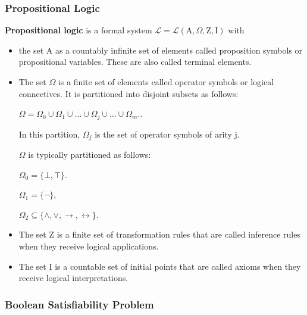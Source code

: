 \documentclass[a4paper, 12pt, bibliography=totoc]{scrartcl}
\begin{document}
\subsubsection{Propositional Logic}
\textbf{Propositional logic} is a formal system $\mathcal{L} = \mathcal{L}(\mathrm {A},\Omega, \mathrm{Z}, \mathrm{I})$ with
\begin{itemize}
	\item the set $\mathrm {A}$ as a countably infinite set of elements called proposition symbols or propositional variables. These are also called terminal elements.
	\item The set $\Omega$ is a finite set of elements called operator symbols or logical connectives. It is partitioned into disjoint subsets as follows:
	
	$\Omega =\Omega _{0}\cup \Omega _{1}\cup \ldots \cup \Omega _{j}\cup \ldots \cup \Omega _{m}.$.
	
	In this partition, $\Omega _{j}$ is the set of operator symbols of arity j.
	
	$\Omega$ is typically partitioned as follows:
	
	${ \Omega _{0}=\{\bot ,\top \}.}$ 
	
	${\Omega _{1}=\{\lnot \},}$
	
	${ \Omega _{2}\subseteq \{\land ,\lor ,\to ,\leftrightarrow \}.}$

	\item The set $\mathrm {Z}$ is a finite set of transformation rules that are called inference rules when they receive logical applications.
	
	\item The set $\mathrm {I}$ is a countable set of initial points that are called axioms when they receive logical interpretations.
\end{itemize}
\subsubsection{Boolean Satisfiability Problem}

\end{document}
